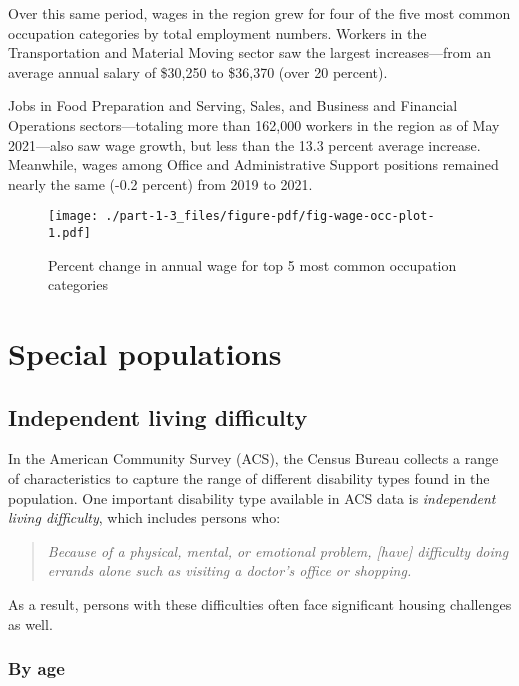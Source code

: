 \documentclass[
  letterpaper,
  DIV=11,
  numbers=noendperiod]{scrreprt}
\begin{document}
Over this same period, wages in the region grew for four of the five
most common occupation categories by total employment numbers. Workers
in the Transportation and Material Moving sector saw the largest
increases---from an average annual salary of \$30,250 to \$36,370 (over
20 percent).

Jobs in Food Preparation and Serving, Sales, and Business and Financial
Operations sectors---totaling more than 162,000 workers in the region as
of May 2021---also saw wage growth, but less than the 13.3 percent
average increase. Meanwhile, wages among Office and Administrative
Support positions remained nearly the same (-0.2 percent) from 2019 to
2021.

\begin{figure}

{\centering \texttt{[image: ./part-1-3\_files/figure-pdf/fig-wage-occ-plot-1.pdf]}

}

\caption{\label{fig-wage-occ-plot}Percent change in annual wage for top
5 most common occupation categories}

\end{figure}

\hypertarget{part-1-4}{%
\chapter{Special populations}\label{part-1-4}}

\hypertarget{independent-living-difficulty}{%
\section{Independent living
difficulty}\label{independent-living-difficulty}}

In the American Community Survey (ACS), the Census Bureau collects a
range of characteristics to capture the range of different disability
types found in the population. One important disability type available
in ACS data is \emph{independent living difficulty}, which includes
persons who:

\begin{quote}
\emph{Because of a physical, mental, or emotional problem, {[}have{]}
difficulty doing errands alone such as visiting a doctor's office or
shopping.}
\end{quote}

As a result, persons with these difficulties often face significant
housing challenges as well.

\hypertarget{by-age}{%
\subsection{By age}\label{by-age}}
\end{document}

